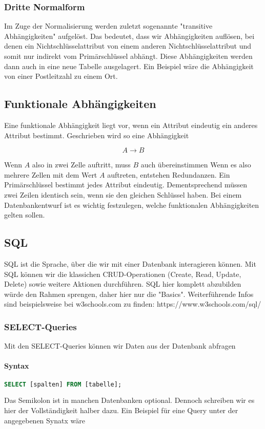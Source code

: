 \documentclass{article}
\begin{document}
	\subsubsection{Dritte Normalform}
	Im Zuge der Normalisierung werden zuletzt sogenannte "transitive Abhängigkeiten" aufgelöst. Das bedeutet, dass wir Abhängigkeiten auflösen, bei denen ein Nichtschlüsselattribut von einem anderen Nichtschlüsselattribut und somit nur indirekt vom Primärschlüssel abhängt. Diese Abhängigkeiten werden dann auch in eine neue Tabelle ausgelagert. Ein Beispiel wäre die Abhängigkeit von einer Postleitzahl zu einem Ort.

	\subsection{Funktionale Abhängigkeiten}
	Eine funktionale Abhängigkeit liegt vor, wenn ein Attribut eindeutig ein anderes Attribut bestimmt. Geschrieben wird so eine Abhängigkeit

	\begin{equation*}
		A \rightarrow B
	\end{equation*}

	Wenn $A$ also in zwei Zelle auftritt, muss $B$ auch übereinstimmen
	Wenn es also mehrere Zellen mit dem Wert $A$ auftreten, entstehen Redundanzen. Ein Primärschlüssel bestimmt jedes Attribut eindeutig. Dementsprechend müssen zwei Zeilen identisch sein, wenn sie den gleichen Schlüssel haben. Bei einem Datenbankentwurf ist es wichtig festzulegen, welche funktionalen Abhängigkeiten gelten sollen.

	\subsection{SQL}
	SQL ist die Sprache, über die wir mit einer Datenbank interagieren können. Mit SQL können wir die klassichen CRUD-Operationen (Create, Read, Update, Delete) sowie weitere Aktionen durchführen. SQL hier komplett abzubilden würde den Rahmen sprengen, daher hier nur die "Basics". Weiterführende Infos sind beispielsweise bei w3schools.com zu finden: https://www.w3schools.com/sql/

	\subsubsection{SELECT-Queries}
	Mit den SELECT-Queries können wir Daten aus der Datenbank abfragen
	
	\paragraph{Syntax}
	\begin{lstlisting}[language=SQL]
	SELECT [spalten] FROM [tabelle]; 
	\end{lstlisting}
	Das Semikolon ist in manchen Datenbanken optional. Dennoch schreiben wir es hier der Vollständigkeit halber dazu. Ein Beispiel für eine Query unter der angegebenen Synatx wäre
\end{document}
